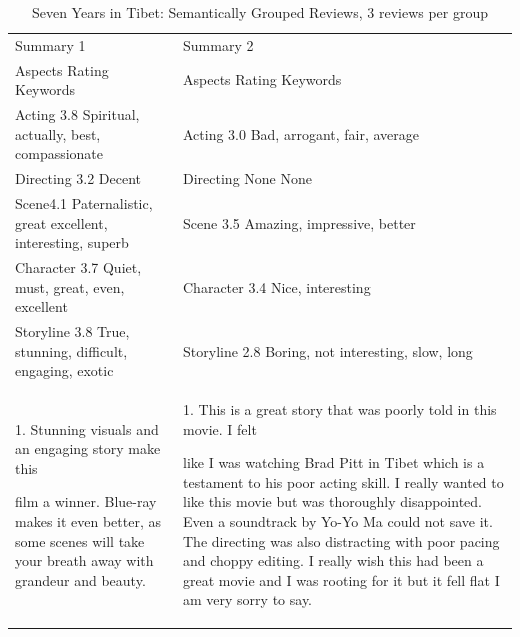 \documentclass[runningheads,a4paper]{llncs}
\begin{document}
\begin{table}[h!]
\centering

\cprotect\caption{  Seven Years in Tibet: Semantically Grouped Reviews, 3 reviews per group}
\renewcommand{\tabularxcolumn}[1]{>{\arraybackslash}m{#1}}

\scalebox{0.8} {\begin{tabularx}{1.22\textwidth}{ >{\hsize}Y }
\toprule

{\bf Seven Years in Tibet - Reviews} \\
 \toprule

Summary 1 & Summary 2 \\
 \midrule

Aspects       Rating   Keywords & Aspects       Rating   Keywords \\
 \midrule

Acting         3.8           Spiritual, actually, best, compassionate & Acting         3.0           Bad, arrogant, fair, average \\
 \midrule

Directing     3.2           Decent & Directing     None       None \\
 \midrule

Scene4.1           Paternalistic, great excellent, interesting, superb & Scene          3.5           Amazing, impressive, better \\
 \midrule

Character    3.7           Quiet, must, great, even, excellent & Character    3.4           Nice, interesting \\
 \midrule

Storyline     3.8           True, stunning, difficult, engaging, exotic & Storyline     2.8           Boring, not interesting, slow, long \\
 \midrule

1.  Stunning   visuals  and   an   engaging   story   make   this

film  a  winner.   Blue-ray  makes  it  even  better,  as  some scenes will take your breath away with grandeur and beauty. & 1. This is a great story that was poorly told in this movie. I felt

like I was watching  Brad Pitt in Tibet which is a testament  to his poor acting skill. I really wanted to like this movie but was thoroughly  disappointed. Even a soundtrack  by Yo-Yo Ma could not save it. The directing was also distracting  with poor pacing and choppy  editing. I really wish this had been a great  movie and I was rooting  for it but it fell flat I am very sorry  to say. \\
 \midrule


\end{tabularx}}
\end{table}
\end{document}
